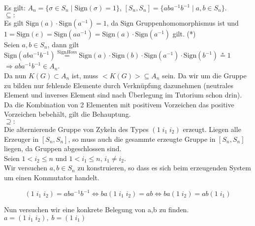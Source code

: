 \documentclass[11pt,a4paper,ngerman]{article}
\newcommand{\sign}{\text{Sign}}
\begin{document}
Es gilt:
$A_n = \{ \sigma \in S_n \; | \; \sign( \sigma ) = 1 \}$, $[S_n,S_n] = \{ aba^{-1}b^{-1} \; | \; a,b \in S_n\}$.\\

$\subseteq :$\\
Es gilt $\sign(a) \cdot \sign(a^{-1}) = 1$, da $\sign$ Gruppenhomomorphismus ist und \\
$1 = \sign(e) = \sign(a a^{-1}) = \sign(a) \cdot \sign(a^{-1})$ gilt. (*)\\

Seien $a,b \in S_n$, dann gilt\\
$\sign (aba^{-1}b^{-1}) \stackrel{\sign Hom}{=} \sign(a) \cdot \sign(b) \cdot \sign(a^{-1}) \cdot \sign(b^{-1}) \stackrel{*}{=} 1$\\
$\Rightarrow aba^{-1}b^{-1} \in A_n$.\\

Da nun $K(G) \subset A_n$ ist, muss $<K(G)> \subseteq A_n$ sein. Da wir um die Gruppe zu bilden nur fehlende Elemente durch Verknüpfung dazunehmen (neutrales Element und inverses Element sind nach Überlegung im Tutorium schon drin). Da die Kombination von 2 Elementen mit positivem Vorzeichen das positive Vorzeichen bebehält, gilt die Behauptung.\\

$\supseteq :$\\

Die alternierende Gruppe von Zykeln des Types $(1 \; i_1 \; i_2)$ erzeugt. Liegen alle Erzeuger in $[S_n, S_n]$, so muss auch die gesammte erzeugte Gruppe in $[S_n,S_n]$ liegen, da Gruppen abgeschlossen sind.\\

Seien $1 < i_2 \leq n$ und $1 < i_1 \leq n$, $i_1 \not= i_2$.\\

Wir versuchen $a,b \in S_n$ zu konstruieren, so dass es sich beim erzeugenden System um einen Kommutator handelt.

$$
(1 \; i_1 \; i_2) = aba^{-1}b^{-1} \Leftrightarrow ba (1 \; i_1 \; i_2) = ab \Leftrightarrow ba (1 \; i_2) = ab (1 \; i_1)
$$

Nun versuchen wir eine konkrete Belegung von a,b zu finden.\\

$a = (1 \; i_1 \; i_2), \; b = (1 \; i_1)$
\end{document}
